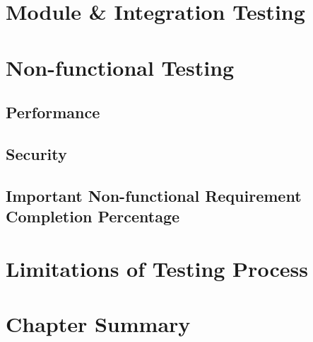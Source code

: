 \section{Module \& Integration Testing}



\section{Non-functional Testing}

\subsection{Performance}

\subsection{Security}

\subsection{Important Non-functional Requirement Completion Percentage}

\section{Limitations of Testing Process}

\section{Chapter Summary}